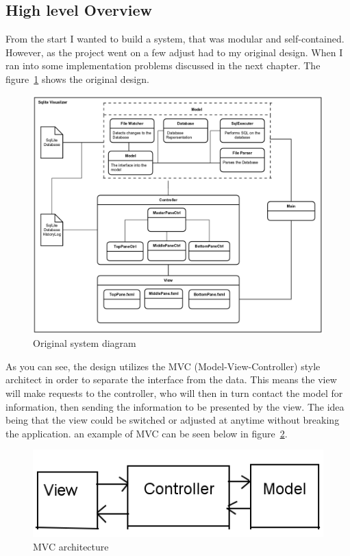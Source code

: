 \subsection{High level Overview}
\label{subsec:high_level_overview}

From the start I wanted to build a system, that was modular and self-contained. However, as the project went on a few adjust had to my original design. When I ran into some implementation problems discussed in the next chapter. The figure~\ref{fig:design_old} shows the original design.

\begin{figure}[H]
	\centering
	\includegraphics[scale=0.2]{images/system_diagram_old.png}
	\caption{Original system diagram}
	\label{fig:design_old}
\end{figure}

As you can see, the design utilizes the MVC (Model-View-Controller) style architect in order to separate the interface from the data. This means the view will make requests to the controller, who will then in turn contact the model for information, then sending the information to be presented by the view. The idea being that the view could be switched or adjusted at anytime without breaking the application. an example of MVC can be seen below in figure~\ref{fig:mvc}.

\begin{figure}[H]
	\centering
	\includegraphics[scale=0.5]{images/mvc.png}
	\caption{MVC architecture}
	\label{fig:mvc}
\end{figure}

